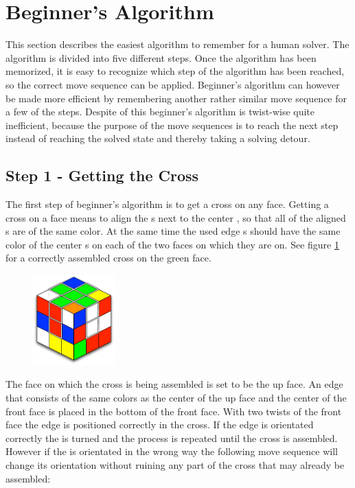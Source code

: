 \section{Beginner's Algorithm}
\label{sec:beginner}
This section describes the easiest algorithm to remember for a human solver.
The algorithm is divided into five different steps. Once the algorithm has been memorized, it is easy to recognize which step of the algorithm has been reached, so the correct move sequence can be applied. 
Beginner's algorithm can however be made more efficient by remembering another rather similar move sequence for a few of the steps. 
Despite of this beginner's algorithm is twist-wise quite inefficient, because the purpose of the move sequences is to reach the next step instead of reaching the solved state and thereby taking a solving detour. 

\subsection{Step 1 - Getting the Cross}\label{sub:step1}
The first step of beginner's algorithm \cite{beginner} is to get a cross on any face. 
Getting a cross on a face means to align the \facelet{}s next to the center \facelet{}, so that all of the aligned \facelet{}s are of the same color. 
At the same time the used edge \cpiece{}s should have the same color of the center \facelet{}s on each of the two faces on which they are on. See figure \ref{fig:1FL-cross} for a correctly assembled cross on the green face.

\begin{figure}
\begin{center}
	\includegraphics[width=0.28\textwidth]{input/pics/1FLcross.pdf}	
\end{center}
\caption{}
\label{fig:1FL-cross}
\end{figure}

The face on which the cross is being assembled is set to be the up face. 
An edge \cpiece{} that consists of the same colors as the center \cpiece{} of the up face and the center \cpiece{} of the front face is placed in the bottom of the front face. 
With two twists of the front face the edge \cpiece{} is positioned correctly in the cross. 
If the edge \cpiece{} is orientated correctly the \cube{} is turned and the process is repeated until the cross is assembled. 
However if the \cpiece{} is orientated in the wrong way the following move sequence will change its orientation without ruining any part of the cross that may already be assembled: \\

